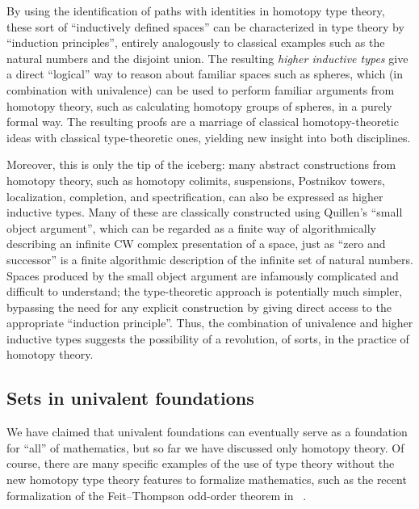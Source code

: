 By using the identification of paths with identities in homotopy type theory, these sort of ``inductively defined spaces'' can be characterized in type theory by ``induction principles'', entirely analogously to classical examples such as the natural numbers and the disjoint union.
The resulting \emph{higher inductive types}
give a direct ``logical'' way to reason about familiar spaces such as spheres, which (in combination with univalence) can be used to perform familiar arguments from homotopy theory, such as calculating homotopy groups of spheres, in a purely formal way.
The resulting proofs are a marriage of classical homotopy-theoretic ideas with classical type-theoretic ones, yielding new insight into both disciplines.

Moreover, this is only the tip of the iceberg: many abstract constructions from homotopy theory, such as homotopy colimits, suspensions, Postnikov towers, localization, completion, and spectrification, can also be expressed as higher inductive types.
Many of these are classically constructed using Quillen's ``small object argument'', which can be regarded as a finite way of algorithmically describing an infinite CW complex presentation of a space, just as ``zero and successor'' is a finite algorithmic description of the infinite set of natural numbers.
Spaces produced by the small object argument are infamously complicated and difficult to understand; the type-theoretic approach is potentially much simpler, bypassing the need for any explicit construction by giving direct access to the appropriate ``induction principle''.
Thus, the combination of univalence and higher inductive types suggests the possibility of a revolution, of sorts, in the practice of homotopy theory.


\subsection{Sets in univalent foundations}


We have claimed that univalent foundations can eventually serve as a foundation for ``all'' of mathematics, but so far we have discussed 
only homotopy theory.  Of course, there are many specific examples of the use of type theory without the new homotopy type theory features to formalize mathematics,
such as the recent formalization of the Feit--Thompson odd-order theorem in \Coq~\citep{gonthier}.

